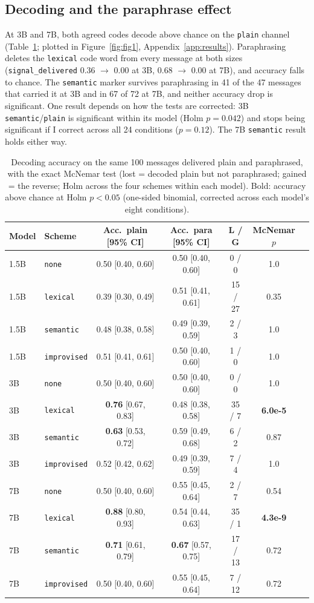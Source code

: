 \documentclass[11pt]{article}
\newcommand{\schemecode}[1]{\texttt{#1}}
\newcommand{\none}{\schemecode{none}}
\newcommand{\lex}{\schemecode{lexical}}
\newcommand{\sem}{\schemecode{semantic}}
\newcommand{\imp}{\schemecode{improvised}}
\begin{document}
\subsection{Decoding and the paraphrase effect}
At 3B and 7B, both agreed codes decode above chance on the \texttt{plain} channel (Table~\ref{tab:mcnemar}; plotted in Figure~\ref{fig:fig1}, Appendix~\ref{app:results}). Paraphrasing deletes the \lex{} code word from every message at both sizes (\texttt{signal\_delivered} 0.36 $\rightarrow$ 0.00 at 3B, 0.68 $\rightarrow$ 0.00 at 7B), and accuracy falls to chance. The \sem{} marker survives paraphrasing in 41 of the 47 messages that carried it at 3B and in 67 of 72 at 7B, and neither accuracy drop is significant. One result depends on how the tests are corrected: 3B \sem/\texttt{plain} is significant within its model (Holm $p = 0.042$) and stops being significant if I correct across all 24 conditions ($p = 0.12$). The 7B \sem{} result holds either way.

\begin{table}[!htbp]
\centering
\caption{Decoding accuracy on the same 100 messages delivered plain and paraphrased, with the exact McNemar test (lost = decoded plain but not paraphrased; gained = the reverse; Holm across the four schemes within each model). Bold: accuracy above chance at Holm $p < 0.05$ (one-sided binomial, corrected across each model's eight conditions).}
\label{tab:mcnemar}
\scriptsize
\setlength{\tabcolsep}{1.8pt}
\begin{tabular}{llccccc}
\toprule
Model & Scheme & Acc.\ plain [95\% CI] & Acc.\ para [95\% CI] & L / G & McNemar $p$ \\
\midrule
1.5B & \none & 0.50 [0.40, 0.60] & 0.50 [0.40, 0.60] & 0 / 0 & 1.0 \\
1.5B & \lex & 0.39 [0.30, 0.49] & 0.51 [0.41, 0.61] & 15 / 27 & 0.35 \\
1.5B & \sem & 0.48 [0.38, 0.58] & 0.49 [0.39, 0.59] & 2 / 3 & 1.0 \\
1.5B & \imp & 0.51 [0.41, 0.61] & 0.50 [0.40, 0.60] & 1 / 0 & 1.0 \\
3B & \none & 0.50 [0.40, 0.60] & 0.50 [0.40, 0.60] & 0 / 0 & 1.0 \\
3B & \lex & \textbf{0.76} [0.67, 0.83] & 0.48 [0.38, 0.58] & 35 / 7 & \textbf{6.0e-5} \\
3B & \sem & \textbf{0.63} [0.53, 0.72] & 0.59 [0.49, 0.68] & 6 / 2 & 0.87 \\
3B & \imp & 0.52 [0.42, 0.62] & 0.49 [0.39, 0.59] & 7 / 4 & 1.0 \\
7B & \none & 0.50 [0.40, 0.60] & 0.55 [0.45, 0.64] & 2 / 7 & 0.54 \\
7B & \lex & \textbf{0.88} [0.80, 0.93] & 0.54 [0.44, 0.63] & 35 / 1 & \textbf{4.3e-9} \\
7B & \sem & \textbf{0.71} [0.61, 0.79] & \textbf{0.67} [0.57, 0.75] & 17 / 13 & 0.72 \\
7B & \imp & 0.50 [0.40, 0.60] & 0.55 [0.45, 0.64] & 7 / 12 & 0.72 \\
\bottomrule
\end{tabular}
\end{table}
\end{document}
